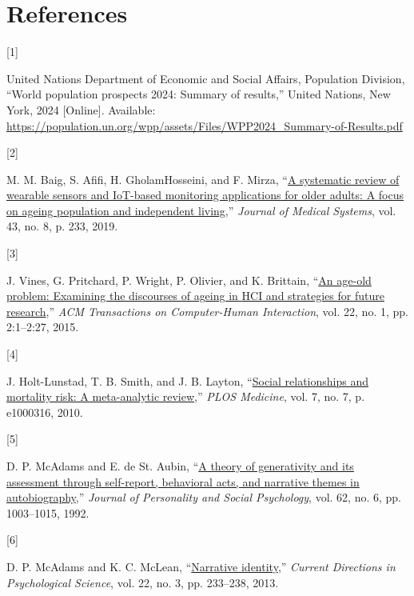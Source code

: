 \documentclass[
  journal,
]{IEEEtran}%
\newlength{\cslhangindent}
\newlength{\csllabelwidth}
\newenvironment{CSLReferences}[2] %
 {\begin{list}{}{%
  \setlength{\itemindent}{0pt}
  \setlength{\leftmargin}{0pt}
  \setlength{\parsep}{0pt}
  \ifodd #1
   \setlength{\leftmargin}{\cslhangindent}
   \setlength{\itemindent}{-1\cslhangindent}
  \fi
  \setlength{\itemsep}{#2\baselineskip}}}
 {\end{list}}
\newcommand{\CSLLeftMargin}[1]{\parbox[t]{\csllabelwidth}{\strut#1\strut}}
\newcommand{\CSLRightInline}[1]{\parbox[t]{\linewidth - \csllabelwidth}{\strut#1\strut}}
\begin{document}
\section*{References}\label{references}

\protect{}\label{refs}
\begin{CSLReferences}{0}{0}
\CSLLeftMargin{{[}1{]} }%
\CSLRightInline{United Nations Department of Economic and Social
Affairs, Population Division, {``World population prospects 2024:
Summary of results,''} United Nations, New York, 2024 {[}Online{]}.
Available:
\url{https://population.un.org/wpp/assets/Files/WPP2024_Summary-of-Results.pdf}}

\CSLLeftMargin{{[}2{]} }%
\CSLRightInline{M. M. Baig, S. Afifi, H. GholamHosseini, and F. Mirza,
{``\href{https://doi.org/10.1007/s10916-019-1365-7}{A systematic review
of wearable sensors and {IoT}-based monitoring applications for older
adults: A focus on ageing population and independent living},''}
\emph{Journal of Medical Systems}, vol. 43, no. 8, p. 233, 2019. }

\CSLLeftMargin{{[}3{]} }%
\CSLRightInline{J. Vines, G. Pritchard, P. Wright, P. Olivier, and K.
Brittain, {``\href{https://doi.org/10.1145/2696867}{An age-old problem:
Examining the discourses of ageing in {HCI} and strategies for future
research},''} \emph{ACM Transactions on Computer-Human Interaction},
vol. 22, no. 1, pp. 2:1--2:27, 2015. }

\CSLLeftMargin{{[}4{]} }%
\CSLRightInline{J. Holt-Lunstad, T. B. Smith, and J. B. Layton,
{``\href{https://doi.org/10.1371/journal.pmed.1000316}{Social
relationships and mortality risk: A meta-analytic review},''} \emph{PLOS
Medicine}, vol. 7, no. 7, p. e1000316, 2010. }

\CSLLeftMargin{{[}5{]} }%
\CSLRightInline{D. P. McAdams and E. de St. Aubin,
{``\href{https://doi.org/10.1037/0022-3514.62.6.1003}{A theory of
generativity and its assessment through self-report, behavioral acts,
and narrative themes in autobiography},''} \emph{Journal of Personality
and Social Psychology}, vol. 62, no. 6, pp. 1003--1015, 1992. }

\CSLLeftMargin{{[}6{]} }%
\CSLRightInline{D. P. McAdams and K. C. McLean,
{``\href{https://doi.org/10.1177/0963721413475622}{Narrative
identity},''} \emph{Current Directions in Psychological Science}, vol.
22, no. 3, pp. 233--238, 2013. }


\end{CSLReferences}
\end{document}
